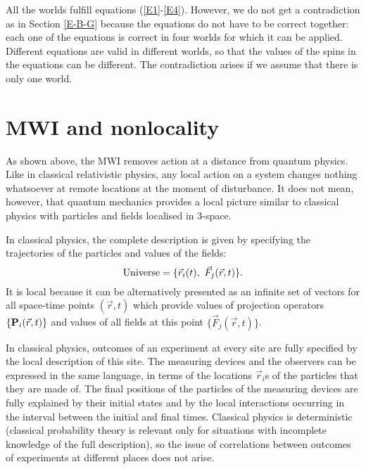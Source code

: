\documentclass[12pt]{article}
\begin{document}
All the worlds  fulfill equations  (\ref{E1}-\ref{E4}). However, we do not get a contradiction as in Section \ref{E-B-G} because the equations do not have to be correct together: each one of the equations is correct in  four worlds for which it can be applied. Different equations are valid in different worlds, so that the  values of the spins in the equations can be different. The contradiction arises  if we assume that there is only one world.

\section{MWI and nonlocality }

As shown above, the MWI removes action at a distance from quantum physics. Like in classical relativistic physics,   any local action on a system changes nothing whatsoever at remote locations at the moment of disturbance. It does not mean, however, that quantum mechanics provides a local picture similar to classical physics with particles and fields localised in 3-space.

In classical physics, the complete description is given by specifying the trajectories of the particles and values of the fields:
\begin{equation}\label{ClUni}
{\rm Universe} = \{\vec{r}_i(t),~ \vec F_j(\vec{r},t)\}.
\end{equation}
It is local because it can be alternatively presented as an infinite set of vectors for all space-time points $(\vec{r},t)$ which provide values of projection operators $\{{\rm \bf P}_i(\vec{r},t)\}$ and values of all fields at this point $\{\vec F_j(\vec{r},t) \}$.

In classical physics, outcomes of an experiment at every site are fully specified by the local description of this site. The measuring devices and the observers can be expressed in the same language, in terms of the locations  $\vec{r}_i$s of the particles that they are made of. The final positions of the particles of the measuring devices are fully explained by their initial states and by the local interactions occurring  in the interval between the initial and final times.   Classical physics is deterministic (classical probability theory is relevant only for situations with incomplete knowledge of the full description), so the issue of correlations between outcomes of experiments at different places does not arise.
\end{document}

